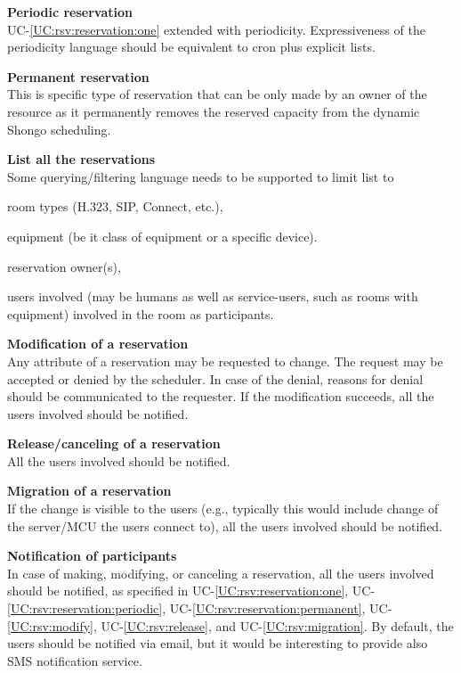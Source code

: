 \documentclass[a4paper]{report}
\makeatletter
\newcounter{UCcounter}
\newenvironment{UseCases}%
	{\begin{list}{\textbf{UC-\arabic{UCcounter}}}{\@nmbrlisttrue\def\@listctr{UCcounter}}}%
	{\end{list}}
\newcommand{\UClabel}[1]{\label{UC:#1}}
\newcommand{\UCref}[1]{UC-\ref{UC:#1}}
\newcommand{\UseCase}[2]{\item\UClabel{#2} \textbf{#1}\\}
\makeatother
\begin{document}
\begin{UseCases}
\UseCase{Periodic reservation}{rsv:reservation:periodic}

\UCref{rsv:reservation:one} extended with periodicity. Expressiveness of the
periodicity language should be equivalent to cron plus explicit lists.

\UseCase{Permanent reservation}{rsv:reservation:permanent}

This is specific type of reservation that can be only made by an owner of the
resource as it permanently removes the reserved capacity from the dynamic
Shongo scheduling.

\UseCase{List all the reservations}{rsv:list}

Some querying/filtering language needs to be supported to limit list to

\begin{compactitem}

\item room types (H.323, SIP, Connect, etc.),

\item equipment (be it class of equipment or a specific device).

\item reservation owner(s),

\item users involved (may be humans as well as service-users, such as rooms
with equipment) involved in the room as participants.

\end{compactitem}

\UseCase{Modification of a reservation}{rsv:modify}

Any attribute of a reservation may be requested to change. The request may be
accepted or denied by the scheduler. In case of the denial, reasons for denial
should be communicated to the requester. If the modification succeeds, all the
users involved should be notified.

\UseCase{Release/canceling of a reservation}{rsv:release}

All the users involved should be notified.

\UseCase{Migration of a reservation}{rsv:migration}

If the change is visible to the users (e.g., typically this would include
change of the server/MCU the users connect to), all the users involved should
be notified.

\UseCase{Notification of participants}{rsv:notification}

In case of making, modifying, or canceling a reservation, all the users
involved should be notified, as specified in \UCref{rsv:reservation:one},
\UCref{rsv:reservation:periodic}, \UCref{rsv:reservation:permanent},
\UCref{rsv:modify}, \UCref{rsv:release}, and \UCref{rsv:migration}. By default,
the users should be notified via email, but it would be interesting to provide
also SMS notification service.


\end{UseCases}
\end{document}
